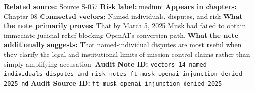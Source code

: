 \documentclass[
  american,
  11pt,
  letterpaper,
]{article}
\begin{document}
\textbf{Related source:}
\hyperref[source-s-057-judge-denies-elon-musks-attempt-to-immediately-block-openais-conversion-to-for-profit-entity]{Source
S-057} \textbf{Risk label:} medium \textbf{Appears in chapters:} Chapter
08 \textbf{Connected vectors:} Named individuals, disputes, and risk
\textbf{What the note primarily proves:} That by March 5, 2025 Musk had
failed to obtain immediate judicial relief blocking OpenAI's conversion
path. \textbf{What the note additionally suggests:} That
named-individual disputes are most useful when they clarify the legal
and institutional limits of mission-control claims rather than simply
amplifying accusation. \textbf{Audit Note ID:}
\texttt{vectors-14-named-individuals-disputes-and-risk-notes-ft-musk-openai-injunction-denied-2025-md}
\textbf{Audit Source ID:} \texttt{ft-musk-openai-injunction-denied-2025}
\end{document}
